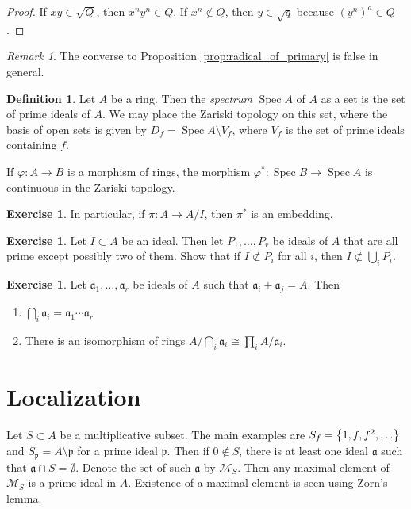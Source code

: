 \documentclass[leqno, openany]{memoir}
\theoremstyle{definition}
\newtheorem{defn}[thm]{Definition}
\newtheorem{exer}[thm]{Exercise}
\theoremstyle{remark}
\newtheorem{rmk}[thm]{Remark}
\theoremstyle{plain}
\theoremstyle{definition}
\theoremstyle{remark}
\newcommand{\mc}[1]{\mathcal{#1}}
\newcommand{\mf}[1]{\mathfrak{#1}}
\DeclareMathOperator{\spec}{Spec}
\begin{document}
\begin{proof}
    If $xy \in \sqrt{Q}$, then $x^ny^n \in Q$. If $x^n \notin Q$, then $y \in \sqrt{q}$ because $(y^n)^a \in Q$.
\end{proof}

\begin{rmk}
    The converse to Proposition \ref{prop:radical_of_primary} is false in general.
\end{rmk}

\begin{defn}
    Let $A$ be a ring. Then the \textit{spectrum} $\spec A$ of $A$ as a set is the set of prime ideals of $A$. We may place the Zariski topology on this set, where the basis of open sets is given by $D_f = \spec A \setminus V_f$, where $V_f$ is the set of prime ideals containing $f$.
\end{defn}

If $\varphi:A \to B$ is a morphism of rings, the morphism $\varphi^*: \spec B \to \spec A$ is continuous in the Zariski topology. 

\begin{exer}
    In particular, if $\pi: A \to A/I$, then $\pi^*$ is an embedding.
\end{exer}

\begin{exer}
    Let $I \subset A$ be an ideal. Then let $P_1, \ldots, P_r$ be ideals of $A$ that are all prime except possibly two of them. Show that if $I \not\subset P_i$ for all $i$, then $I \not\subset \bigcup_i P_i$.
\end{exer}

\begin{exer}
    Let $ \mathfrak{a}_1, \ldots, \mathfrak{a}_r$ be ideals of $A$ such that $ \mathfrak{a}_i + \mathfrak{a}_j = A $. Then 
    \begin{enumerate}
        \item $\bigcap_i \mathfrak{a}_i = \mathfrak{a}_1 \cdots \mathfrak{a}_r$
        \item There is an isomorphism of rings $A/ \bigcap_i \mf{a}_i \cong \prod_i A/\mf{a}_i$.
    \end{enumerate}
\end{exer}

\section{Localization}%
\label{sec:localization}

Let $S \subset A$ be a multiplicative subset. The main examples are $S_f = \qty{1,f,f^2, \ldots}$ and $S_{\mf{p}} = A \setminus \mf{p}$ for a prime ideal $\mf{p}$. Then if $0 \notin S$, there is at least one ideal $\mf{a}$ such that $\mf{a} \cap S = \emptyset$. Denote the set of such $\mf{a}$ by $\mc{M}_S$. Then any maximal element of $\mc{M}_S$ is a prime ideal in $A$. Existence of a maximal element is seen using Zorn's lemma.
\end{document}
